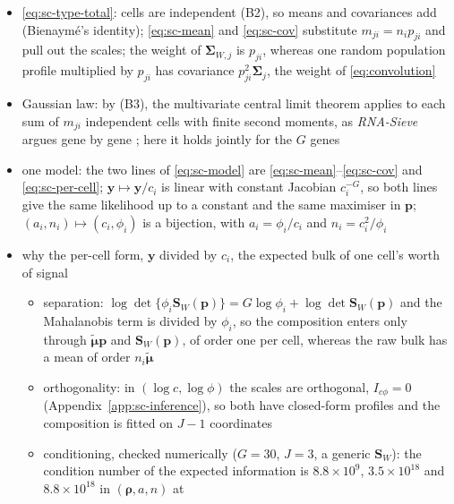 \begin{itemize}
  \item \eqref{eq:sc-type-total}: cells are independent (B2), so means and covariances add (Bienaym\'e's identity);
        \eqref{eq:sc-mean} and \eqref{eq:sc-cov} substitute \(m_{ji}=n_{i}p_{ji}\) and pull out the scales; the weight of
        \(\boldsymbol{\Sigma}_{W,j}\) is \(p_{ji}\), whereas one random population profile multiplied by \(p_{ji}\) has covariance
        \(p_{ji}^{2}\boldsymbol{\Sigma}_{j}\), the weight of \eqref{eq:convolution}
  \item Gaussian law: by (B3), the multivariate central limit theorem applies to each sum of \(m_{ji}\) independent cells
        with finite second moments, as \emph{RNA-Sieve} argues gene by gene
        \cite{erdmann-phamLikelihoodbasedDeconvolutionBulk2021}; here it holds jointly for the \(G\) genes
  \item one model: the two lines of \eqref{eq:sc-model} are \eqref{eq:sc-mean}--\eqref{eq:sc-cov} and \eqref{eq:sc-per-cell};
        \(\boldsymbol{y}\mapsto\boldsymbol{y}/c_{i}\) is linear with constant Jacobian \(c_{i}^{-G}\), so both lines give the same
        likelihood up to a constant and the same maximiser in \(\boldsymbol{p}\); \((a_{i},n_{i})\mapsto(c_{i},\phi_{i})\) is a bijection,
        with \(a_{i}=\phi_{i}/c_{i}\) and \(n_{i}=c_{i}^{2}/\phi_{i}\)
  \item why the per-cell form, \(\boldsymbol{y}\) divided by \(c_{i}\), the expected bulk of one cell's worth of signal
  \begin{itemize}
    \item separation: \(\log\det\{\phi_{i}\boldsymbol{S}_{W}(\boldsymbol{p})\}=G\log\phi_{i}+\log\det\boldsymbol{S}_{W}(\boldsymbol{p})\) and the
          Mahalanobis term is divided by \(\phi_{i}\), so the composition enters only through \(\tilde{\boldsymbol{\mu}}\boldsymbol{p}\) and
          \(\boldsymbol{S}_{W}(\boldsymbol{p})\), of order one per cell, whereas the raw bulk has a mean of order \(n_{i}\tilde{\boldsymbol{\mu}}\)
    \item orthogonality: in \((\log c,\log\phi)\) the scales are orthogonal, \(I_{c\phi}=0\) (Appendix~\ref{app:sc-inference}),
          so both have closed-form profiles and the composition is fitted on \(J-1\) coordinates
    \item conditioning, checked numerically (\(G=30\), \(J=3\), a generic \(\boldsymbol{S}_{W}\)): the condition number of the
          expected information is \(8.8\times10^{9}\), \(3.5\times10^{18}\) and \(8.8\times10^{18}\) in \((\boldsymbol{\rho},a,n)\) at

\end{itemize}
\end{itemize}

